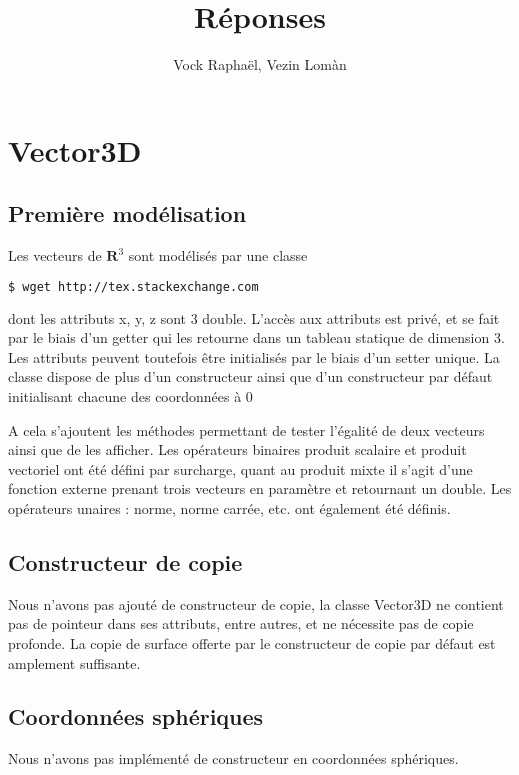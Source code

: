 \documentclass[12pt, letterpaper, twoside]{article}
\title{Réponses}
\author{Vock Raphaël, Vezin Lomàn}
\begin{document}
\section{Vector3D}

\subsection{Première modélisation}

Les vecteurs de $\textbf{R}^3$ sont modélisés par une classe \begin{lstlisting}[language=bash]
  $ wget http://tex.stackexchange.com
\end{lstlisting} dont les attributs x, y, z sont 3 double.
L'accès aux attributs est privé, et se fait par le biais d'un getter qui les retourne dans un tableau statique de dimension 3.
Les attributs peuvent toutefois être initialisés par le biais d'un setter unique.
La classe dispose de plus d'un constructeur ainsi que d'un constructeur par défaut initialisant chacune des coordonnées à 0

A cela s'ajoutent les méthodes permettant de tester l'égalité de deux vecteurs ainsi que de les afficher.
Les opérateurs binaires produit scalaire et produit vectoriel ont été défini par surcharge, quant au produit mixte il s'agit d'une fonction externe prenant trois vecteurs en paramètre et retournant un double.
Les opérateurs unaires : norme, norme carrée, etc. ont également été définis.

\subsection{Constructeur de copie}
Nous n'avons pas ajouté de constructeur de copie, la classe Vector3D ne contient pas de pointeur dans ses attributs, entre autres, et ne nécessite pas de copie profonde. La copie de surface offerte par le constructeur de copie par défaut est amplement suffisante.

\subsection{Coordonnées sphériques}
Nous n'avons pas implémenté de constructeur en coordonnées sphériques.
\end{document}
